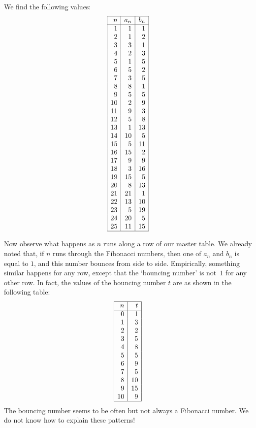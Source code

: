 \documentclass[12pt]{article}
\begin{document}
We find the following values:
\[
\begin{array}{|r|r|r|}
\hline
n & a_n & b_n \\
\hline
1  &  1  &  1  \\
2  &  1  &  2  \\
3  &  3  &  1  \\
4  &  2  &  3  \\
5  &  1  &  5  \\
6  &  5  &  2  \\
7  &  3  &  5  \\
8  &  8  &  1  \\
9  &  5  &  5  \\
10  &  2  &  9  \\
11  &  9  &  3  \\
12  &  5  &  8  \\
13  &  1  &  13  \\
14  &  10  &  5  \\
15  &  5  &  11  \\
16  &  15  &  2  \\
17  &  9  &  9  \\
18  &  3  &  16  \\
19  &  15  &  5  \\
20  &  8  &  13  \\
21  &  21  &  1  \\
22  &  13  &  10  \\
23  &  5  &  19  \\
24  &  20  &  5  \\
25  &  11  &  15  \\
\hline
\end{array}
\]

Now observe what happens as $n$ runs along a row of our master
table. We already noted that, if $n$ runs through the Fibonacci
numbers, then one of $a_n$ and $b_n$ is equal to $1$, and this
number bounces from side to side. Empirically, something similar
happens for any row, except that the `bouncing number' is not~$1$
for any other row. In fact, the values of the bouncing number
$t$ are as shown in the following table:
\[
\begin{array}{|r|r|}
\hline
n & t \\
\hline
0 & 1 \\
1 & 3 \\
2 & 2 \\
3 & 5 \\
4 & 8 \\
5 & 5 \\
6 & 9 \\
7 & 5 \\
8 & 10 \\
9 & 15 \\
10 & 9 \\
\hline
\end{array}
\]
The bouncing number seems to be often but not always a Fibonacci
number. We do not know how to explain these patterns!
\end{document}
